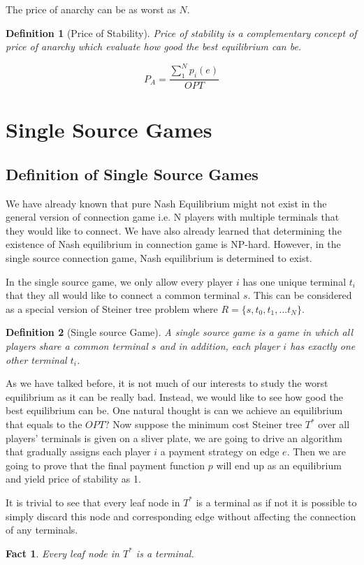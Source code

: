 \documentclass[11pt,psfig,times]{article}
\newtheorem{definition}{Definition}[section]
\newtheorem{fact}{Fact}
\begin{document}
The price of anarchy can be as worst as \(N\).

\begin{definition}[Price of Stability] Price of stability is a complementary concept of price of anarchy which evaluate how good the best equilibrium can be. 

\[P_A = \dfrac{\sum_{1}^{N}p_i(e) }{OPT}\]
\end{definition}

\section{Single Source Games}
\subsection{Definition of Single Source Games}
We have already known that pure Nash Equilibrium might not exist in the general version of connection game i.e. N players with multiple terminals that they would like to connect. We have also already learned that determining the existence of Nash equilibrium in connection game is NP-hard. However, in the single source connection game, Nash equilibrium is determined to exist.

In the single source game, we only allow every player \(i\) has one unique terminal \(t_i\)that they all would like to connect a common terminal \(s\). This can be considered as a special version of Steiner tree problem where \(R = \{s,t_0,t_1,...t_N\}\). 

\begin{definition}[Single source Game]
	A single source game is a game in which all players share a common terminal \(s\) and in addition, each player \(i\) has exactly one other terminal \(t_i\).
\end{definition}

As we have talked before, it is not much of our interests to study the worst equilibrium as it can be really bad. Instead, we would like to see how good the best equilibrium can be. One natural thought is can we achieve an equilibrium that equals to the \(OPT\)? Now suppose the minimum cost Steiner tree \(T^*\) over all players' terminals is given on a sliver plate, we are going to drive an algorithm that gradually assigns each player \(i\) a payment strategy on edge \(e\). Then we are going to prove that the final payment function \(p\) will end up as an equilibrium and yield price of stability as 1.  

It is trivial to see that every leaf node in \(T^*\) is a terminal as if not it is possible to simply discard this node and corresponding edge without affecting the connection of any terminals.
\begin{fact}
	Every leaf node in \(T^*\) is a terminal. 
\end{fact}
\end{document}

